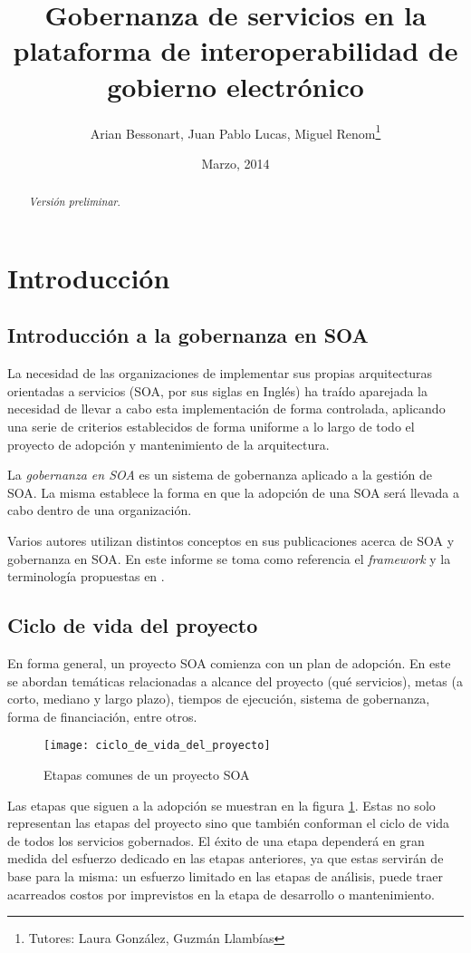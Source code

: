 \documentclass[11pt]{article}
\title{Gobernanza de servicios en la plataforma de interoperabilidad de gobierno electrónico}
\author{Arian Bessonart, Juan Pablo Lucas, Miguel Renom\thanks{Tutores: Laura González, Guzmán Llambías}}
\date{Marzo, 2014}
\begin{document}
	\maketitle
	\pagebreak

	\begin{abstract}
		\emph{Versión preliminar}.
	\end{abstract}
	\pagebreak

	\section{Introducción}
		\subsection{Introducción a la gobernanza en SOA}
			La necesidad de las organizaciones de implementar sus propias arquitecturas orientadas a servicios (SOA, por sus siglas en Inglés) ha traído aparejada la necesidad de llevar a cabo esta implementación de forma controlada, aplicando una serie de criterios establecidos de forma uniforme a lo largo de todo el proyecto de adopción y mantenimiento de la arquitectura.

			La \emph{gobernanza en SOA} es un sistema de gobernanza aplicado a la gestión de SOA. La misma establece la forma en que la adopción de una SOA será llevada a cabo dentro de una organización.

			Varios autores utilizan distintos conceptos en sus publicaciones acerca de SOA y gobernanza en SOA. En este informe se toma como referencia el \emph{framework} y la terminología propuestas en \cite{Erl:2011:SGG:1983453}.

		\subsection{Ciclo de vida del proyecto}
			En forma general, un proyecto SOA comienza con un plan de adopción. En este se abordan temáticas relacionadas a alcance del proyecto (qué servicios), metas (a corto, mediano y largo plazo), tiempos de ejecución, sistema de gobernanza, forma de financiación, entre otros.

			\begin{figure}[h]
			    \centering
			    \texttt{[image: ciclo\_de\_vida\_del\_proyecto]}
			    \caption{Etapas comunes de un proyecto SOA}
			    \label{figura:ciclo_de_vida_del_proyecto}
			\end{figure}


			Las etapas que siguen a la adopción se muestran en la figura \ref{figura:ciclo_de_vida_del_proyecto}. Estas no solo representan las etapas del proyecto sino que también conforman el ciclo de vida de todos los servicios gobernados. El éxito de una etapa dependerá en gran medida del esfuerzo dedicado en las etapas anteriores, ya que estas servirán de base para la misma: un esfuerzo limitado en las etapas de análisis, puede traer acarreados costos por imprevistos en la etapa de desarrollo o mantenimiento.
\end{document}
